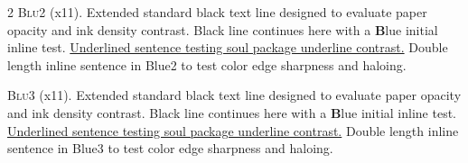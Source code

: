 \documentclass[9pt]{article}
\let\oldlettrine\lettrine
\renewcommand{\lettrine}[3][]{%
	\clubpenalty=10000
	\oldlettrine[#1]{#2}{#3}%
}
\begin{document}
\begin{multicols}{2}
\lettrine[lines=2]{\textcolor{Blue2}{B}}{lu2} (x11). Extended standard black text line designed to evaluate paper opacity and ink density contrast. Black line continues here with a \textbf{\textcolor{Blue2}{B}}lue initial inline test. \ul{Underlined sentence testing soul package underline contrast.} \textcolor{Blue2}{Double length inline sentence in Blue2 to test color edge sharpness and haloing.}
\medskip

\lettrine[lines=2]{\textcolor{Blue3}{B}}{lu3} (x11). Extended standard black text line designed to evaluate paper opacity and ink density contrast. Black line continues here with a \textbf{\textcolor{Blue3}{B}}lue initial inline test. \ul{Underlined sentence testing soul package underline contrast.} \textcolor{Blue3}{Double length inline sentence in Blue3 to test color edge sharpness and haloing.}

\end{multicols}
\end{document}
